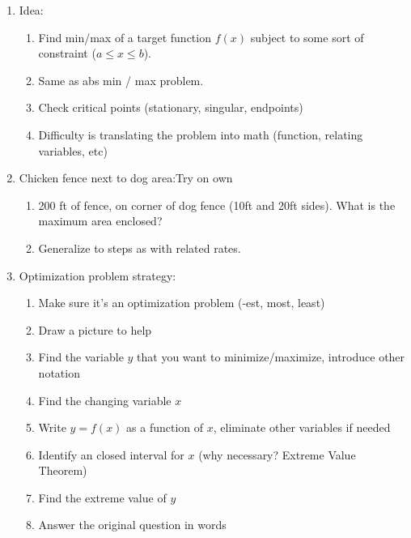 \documentclass{article}
\begin{document}
\begin{enumerate}
\item Idea:
\begin{enumerate}
\item Find min/max of a target function $f(x)$ subject to some sort of constraint ($a \leq x \leq b$).
\item Same as abs min / max problem.
\item Check critical points (stationary, singular, endpoints)
\item Difficulty is translating the problem into math (function, relating variables, etc)
\end{enumerate}

\item Chicken fence next to dog area:Try on own
\begin{enumerate}
\item 200 ft of fence, on corner of dog fence (10ft and 20ft sides). What is the maximum area enclosed?
\item Generalize to steps as with related rates.
\end{enumerate}

\item Optimization problem strategy:
\begin{enumerate}
\item Make sure it's an optimization problem (-est, most, least)
\item Draw a picture to help
\item Find the variable $y$ that you want to minimize/maximize, introduce other notation
\item Find the changing variable $x$
\item Write $y = f(x)$ as a function of $x$, eliminate other variables if needed
\item Identify an closed interval for $x$ (why necessary? Extreme Value Theorem)
\item Find the extreme value of $y$
\item Answer the original question in words
\end{enumerate}


\end{enumerate}
\end{document}
